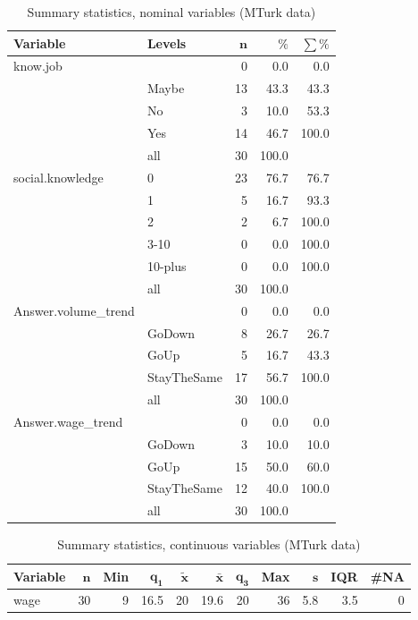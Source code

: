 \documentclass[a4paper,10pt]{article}\usepackage[]{graphicx}\usepackage[]{color}
\begin{document}
\begin{table}[ht]
\centering
{\footnotesize
\begin{tabular}{ll|rrr}
 \textbf{Variable} & \textbf{Levels} & $\mathbf{n}$ & $\mathbf{\%}$ & $\mathbf{\sum \%}$ \\ 
  \hline
know.job &  & 0 & 0.0 & 0.0 \\ 
   & Maybe & 13 & 43.3 & 43.3 \\ 
   & No & 3 & 10.0 & 53.3 \\ 
   & Yes & 14 & 46.7 & 100.0 \\ 
   \hline
 & all & 30 & 100.0 &  \\ 
   \hline
\hline
social.knowledge & 0 & 23 & 76.7 & 76.7 \\ 
   & 1 & 5 & 16.7 & 93.3 \\ 
   & 2 & 2 & 6.7 & 100.0 \\ 
   & 3-10 & 0 & 0.0 & 100.0 \\ 
   & 10-plus & 0 & 0.0 & 100.0 \\ 
   \hline
 & all & 30 & 100.0 &  \\ 
   \hline
\hline
Answer.volume\_trend &  & 0 & 0.0 & 0.0 \\ 
   & GoDown & 8 & 26.7 & 26.7 \\ 
   & GoUp & 5 & 16.7 & 43.3 \\ 
   & StayTheSame & 17 & 56.7 & 100.0 \\ 
   \hline
 & all & 30 & 100.0 &  \\ 
   \hline
\hline
Answer.wage\_trend &  & 0 & 0.0 & 0.0 \\ 
   & GoDown & 3 & 10.0 & 10.0 \\ 
   & GoUp & 15 & 50.0 & 60.0 \\ 
   & StayTheSame & 12 & 40.0 & 100.0 \\ 
   \hline
 & all & 30 & 100.0 &  \\ 
   \hline
\hline
\end{tabular}
}
\caption{Summary statistics, nominal variables (MTurk data)} 
\label{tab1:49-1010}
\end{table}
\begin{table}[ht]
\centering
{\footnotesize
\begin{tabular}{lrrrrrrrrrr}
 \textbf{Variable} & $\mathbf{n}$ & \textbf{Min} & $\mathbf{q_1}$ & $\mathbf{\widetilde{x}}$ & $\mathbf{\bar{x}}$ & $\mathbf{q_3}$ & \textbf{Max} & $\mathbf{s}$ & \textbf{IQR} & \textbf{\#NA} \\ 
  \hline
wage & 30 & 9 & 16.5 & 20 & 19.6 & 20 & 36 & 5.8 & 3.5 & 0 \\ 
  \end{tabular}
}
\caption{Summary statistics, continuous variables (MTurk data)} 
\label{tab2:49-1010}
\end{table}
\end{document}
